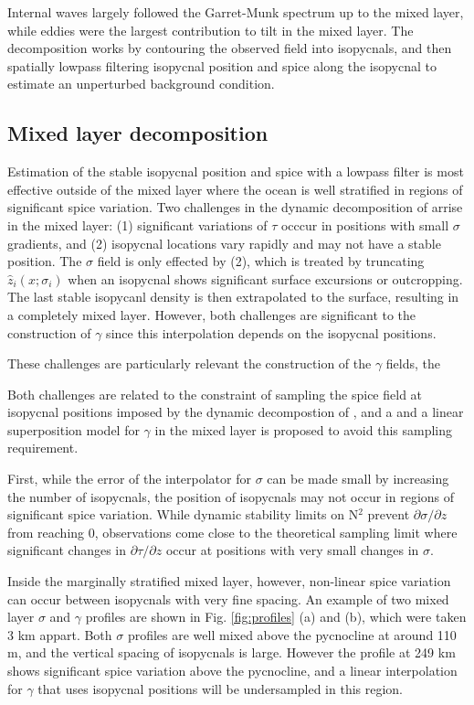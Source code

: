 \documentclass[preprint,NumberedRefs]{JASA}
\begin{document}
Internal waves largely followed the Garret-Munk spectrum up to the mixed layer, while eddies were the largest contribution to tilt in the mixed layer.  The decomposition works by contouring the observed field into isopycnals, and then spatially lowpass filtering isopycnal position and spice along the isopycnal to estimate an unperturbed background condition.

\subsection{Mixed layer decomposition}
Estimation of the stable isopycnal position and spice with a lowpass filter is most effective outside of the mixed layer where the ocean is well stratified in regions of significant spice variation. Two challenges in the dynamic decomposition of \citep{dzieciuch2004} arrise in the mixed layer: (1) significant variations of $\tau$ occcur in positions with small $\sigma$ gradients, and (2) isopycnal locations vary rapidly and may not have a stable position. The $\sigma$ field is only effected by (2), which is treated by truncating $\hat{z}_i(x; \sigma_i)$ when an isopycnal shows significant surface excursions or outcropping. The last stable isopycanl density is then extrapolated to the surface, resulting in a completely mixed layer. However, both challenges are significant to the construction of $\gamma$ since this interpolation depends on the isopycnal positions.

These challenges are particularly relevant the construction of the $\gamma$ fields, the 

Both challenges are related to the constraint of sampling the spice field at isopycnal positions imposed by the dynamic decompostion of \citep{dzieciuch2004}, and a and a linear superposition model for $\gamma$ in the mixed layer is proposed to avoid this sampling requirement.

First, while the error of the interpolator for $\sigma$ can be made small by increasing the number of isopycnals, the position of isopycnals may not occur in regions of significant spice variation. While dynamic stability limits on N$^2$ prevent $\partial \sigma / \partial z$ from reaching 0, observations come close to the theoretical sampling limit where significant changes in $\partial \tau / \partial z$ occur at positions with very small changes in $\sigma$.


 Inside the marginally stratified mixed layer, however, non-linear spice variation can occur between isopycnals with very fine spacing. An example of two mixed layer $\sigma$ and $\gamma$ profiles are shown in Fig. \ref{fig:profiles} (a) and (b), which were taken 3 km appart. Both $\sigma$ profiles are well mixed above the pycnocline at around 110 m, and the vertical spacing of isopycnals is large. However the profile at 249 km shows significant spice variation above the pycnocline, and a linear interpolation for $\gamma$ that uses isopycnal positions will be undersampled in this region.
\end{document}

